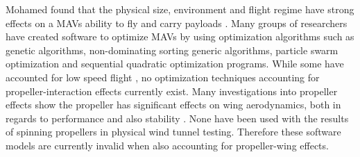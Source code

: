 Mohamed found that the physical size, environment and flight regime have strong effects on a MAVs ability to fly and carry payloads \cite{Mohamed2014}. Many groups of researchers have created software to optimize MAVs by using optimization algorithms such as genetic algorithms, non-dominating sorting generic algorithms, particle swarm optimization and sequential quadratic optimization programs. While some have accounted for low speed flight \cite{Vijayanandh2019, Bronz2009, HASSANALIAN2019}, no optimization techniques accounting for propeller-interaction effects currently exist. Many investigations into propeller effects show the propeller has significant effects on wing aerodynamics, both in regards to performance and also stability \cite{Parga2007, Jana2020}. None have been used with the results of spinning propellers in physical wind tunnel testing. Therefore these software models are currently invalid when also accounting for propeller-wing effects.


